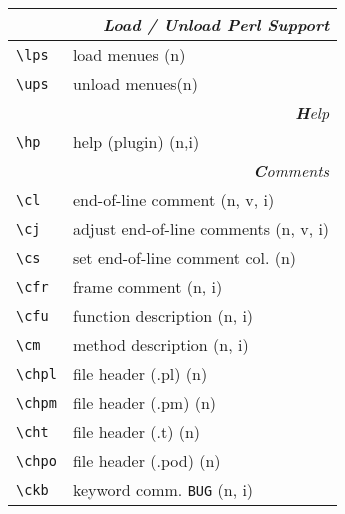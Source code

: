 \documentclass[oneside,10pt,landscape,DIV17]{scrartcl}
\begin{document}
\begin{multicols}{3}
\begin{center}
\begin{tabular}[]{|p{11mm}|p{58mm}|}
\hline
\multicolumn{2}{|r|}{\textsl{\textbf{L}oad / \textbf{U}nload Perl Support}}\\
\hline \verb'\lps'  & load menues  \hfill (n) \\
\hline \verb'\ups'  & unload menues\hfill (n) \\
\hline
\hline 
\multicolumn{2}{|r|}{\textsl{\textbf{H}elp}}    \\
\hline \verb'\hp'   & help (plugin) \hfill (n,i)\\
\hline 
\hline
\multicolumn{2}{|r|}{\textsl{\textbf{C}omments}}                       \\
\hline \verb'\cl'   & end-of-line comment               \hfill (n, v, i)\\
\hline \verb'\cj'   & adjust end-of-line comments       \hfill (n, v, i)\\
\hline \verb'\cs'   & set end-of-line comment col.      \hfill (n)      \\
\hline \verb'\cfr'  & frame comment                     \hfill (n, i)   \\
\hline \verb'\cfu'  & function description              \hfill (n, i)   \\
\hline \verb'\cm'   & method description                \hfill (n, i)   \\
\hline \verb'\chpl' & file header (.pl)                 \hfill (n)      \\
\hline \verb'\chpm' & file header (.pm)                 \hfill (n)      \\
\hline \verb'\cht'  & file header (.t)                  \hfill (n)      \\
\hline \verb'\chpo' & file header (.pod)                \hfill (n)      \\
\hline \verb'\ckb'  & keyword comm. \verb'BUG'          \hfill (n, i)   \\

\end{tabular}
\end{center}
\end{multicols}
\end{document}
